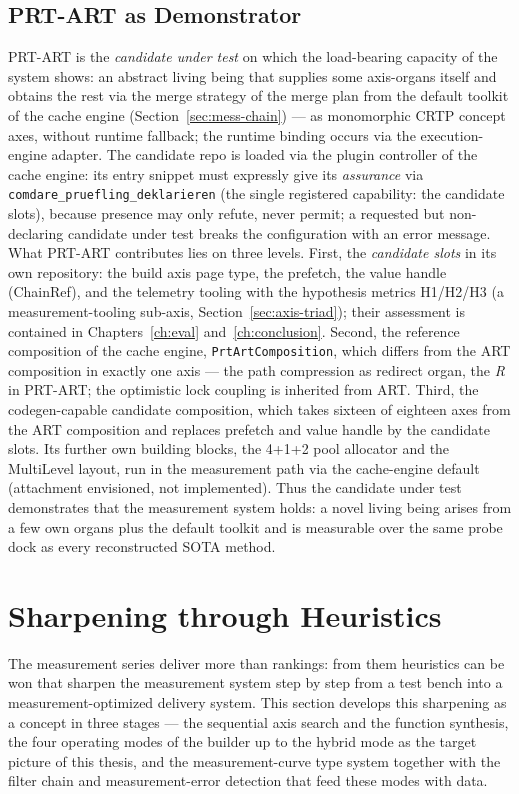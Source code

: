 \begin{nurkurz}
\section{PRT-ART as Demonstrator}\label{sec:prtart-demo}
PRT-ART is the \emph{candidate under test} on which the load-bearing capacity of the system shows: an
abstract living being that supplies some axis-organs itself and obtains the rest via the merge strategy
of the merge plan from the default toolkit of the cache engine (Section~\ref{sec:mess-chain}) --- as
monomorphic CRTP concept axes, without runtime fallback; the runtime binding occurs via the
execution-engine adapter. The candidate repo is loaded via the plugin controller of the cache engine:
its entry snippet must expressly give its \emph{assurance} via
\texttt{comdare\_\allowbreak{}pruefling\_\allowbreak{}deklarieren} (the single registered capability:
the candidate slots), because presence may only refute, never permit; a requested but non-declaring
candidate under test breaks the configuration with an error message. What PRT-ART contributes lies on
three levels. First, the \emph{candidate slots} in its own repository: the build axis page type, the
prefetch, the value handle (ChainRef), and the telemetry tooling with the hypothesis metrics H1/H2/H3
(a measurement-tooling sub-axis, Section~\ref{sec:axis-triad}); their assessment is contained in
Chapters~\ref{ch:eval} and~\ref{ch:conclusion}. Second, the reference composition of the cache engine,
\texttt{PrtArtComposition}, which differs from the ART composition in exactly one axis --- the path
compression as redirect organ, the \emph{R} in PRT-ART\@; the optimistic lock coupling is inherited
from ART\@. Third, the codegen-capable candidate composition, which takes sixteen of eighteen axes from
the ART composition and replaces prefetch and value handle by the candidate slots. Its further own
building blocks, the 4+1+2 pool allocator and the MultiLevel layout, run in the measurement path via
the cache-engine default (attachment envisioned, not implemented). Thus the candidate under test
demonstrates that the measurement system holds: a novel living being arises from a few own organs plus
the default toolkit and is measurable over the same probe dock as every reconstructed SOTA method.
\end{nurkurz}

\section{Sharpening through Heuristics}\label{sec:heuristics}
The measurement series deliver more than rankings: from them heuristics can be won that sharpen the
measurement system step by step from a test bench into a measurement-optimized delivery system.
This section develops this sharpening as a concept in three stages --- the
sequential axis search and the function synthesis, the four operating modes of the builder up to the hybrid mode
as the target picture of this thesis, and the measurement-curve type system together with the filter chain and measurement-error detection that
feed these modes with data.

